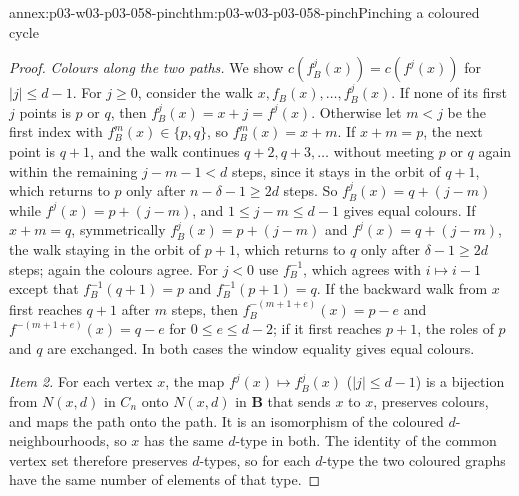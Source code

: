 \begin{annexitem}{annex:p03-w03-p03-058-pinch}{thm:p03-w03-p03-058-pinch}{Pinching a coloured cycle}
\begin{proof}
\emph{Colours along the two paths.} We show \(c(f_B^j(x))=c(f^j(x))\) for
\(|j|\le d-1\). For \(j\ge0\), consider the walk
\(x,f_B(x),\ldots,f_B^j(x)\). If none of its first \(j\) points is \(p\) or
\(q\), then \(f_B^j(x)=x+j=f^j(x)\). Otherwise let \(m<j\) be the first index
with \(f_B^m(x)\in\{p,q\}\), so \(f_B^m(x)=x+m\). If \(x+m=p\), the next
point is \(q+1\), and the walk continues \(q+2,q+3,\ldots\) without meeting
\(p\) or \(q\) again within the remaining \(j-m-1<d\) steps, since it stays
in the orbit of \(q+1\), which returns to \(p\) only after
\(n-\delta-1\ge2d\) steps. So \(f_B^j(x)=q+(j-m)\) while
\(f^j(x)=p+(j-m)\), and \(1\le j-m\le d-1\) gives equal colours. If
\(x+m=q\), symmetrically \(f_B^j(x)=p+(j-m)\) and \(f^j(x)=q+(j-m)\),
the walk staying in the orbit of \(p+1\), which returns to \(q\) only after
\(\delta-1\ge2d\) steps; again the colours agree. For \(j<0\) use
\(f_B^{-1}\), which agrees with \(i\mapsto i-1\) except that
\(f_B^{-1}(q+1)=p\) and \(f_B^{-1}(p+1)=q\). If the backward walk from
\(x\) first reaches \(q+1\) after \(m\) steps, then
\(f_B^{-(m+1+e)}(x)=p-e\) and \(f^{-(m+1+e)}(x)=q-e\) for
\(0\le e\le d-2\); if it first reaches \(p+1\), the roles of \(p\) and \(q\)
are exchanged. In both cases the window equality gives equal colours.

\emph{Item 2.} For each vertex \(x\), the map \(f^j(x)\mapsto f_B^j(x)\)
(\(|j|\le d-1\)) is a bijection from \(N(x,d)\) in \(C_n\) onto \(N(x,d)\)
in \(\mathbf B\) that sends \(x\) to \(x\), preserves colours, and maps the
path onto the path. It is an isomorphism of the coloured
\(d\)-neighbourhoods, so \(x\) has the same \(d\)-type in both. The identity
of the common vertex set therefore preserves \(d\)-types, so for each
\(d\)-type the two coloured graphs have the same number of elements of
that type.
\end{proof}
\end{annexitem}

